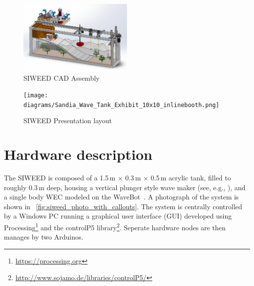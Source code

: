 \documentclass[11pt, letterpaper]{article}
\begin{document}
\begin{figure}[tb]
  \centering
  \includegraphics[width=0.5\textwidth]{diagrams/SIWEED_CAD.png}
  \caption{SIWEED CAD Assembly}
  \label{fig:CAD}
\end{figure}
\begin{figure}[tb]
  \centering
  \texttt{[image: diagrams/Sandia\_Wave\_Tank\_Exhibit\_10x10\_inlinebooth.png]}
  \caption{SIWEED Presentation layout}
  \label{fig:Exhibit}
\end{figure}

\section{Hardware description} %
The SIWEED is composed of a 1.5\,m $\times{}$ 0.3\,m $\times{}$ 0.5\,m acrylic tank, filled to roughly 0.3\,m deep, housing a vertical plunger style wave maker (see, e.g., \cite{hyun1976simplified}), and a single body WEC modeled on the WaveBot~\cite{Coe2016a}.
A photograph of the system is shown in \figurename~\ref{fig:siweed_photo_with_callouts}.
The system is centrally controlled by a Windows PC running a graphical user interface (GUI) developed using Processing\footnote{\url{https://processing.org}} and the controlP5 library\footnote{\url{http://www.sojamo.de/libraries/controlP5/}}.
Seperate hardware nodes are then manages by two Arduinos.
\end{document}

